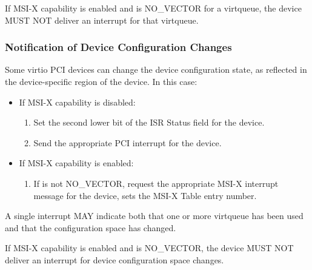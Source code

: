 If MSI-X capability is enabled and  is
NO_VECTOR for a virtqueue, the device MUST NOT deliver an interrupt
for that virtqueue.

\subsubsection{Notification of Device Configuration Changes}\label{sec:Virtio Transport Options / Virtio Over PCI Bus / PCI-specific Initialization And Device Operation / Notification of Device Configuration Changes}

Some virtio PCI devices can change the device configuration
state, as reflected in the device-specific region of the device. In this case:

\begin{itemize}
  \item If MSI-X capability is disabled:
    \begin{enumerate}
    \item Set the second lower bit of the ISR Status field for the device.

    \item Send the appropriate PCI interrupt for the device.
    \end{enumerate}

  \item If MSI-X capability is enabled:
    \begin{enumerate}
    \item If  is not NO_VECTOR,
      request the appropriate MSI-X interrupt message for the
      device,  sets the MSI-X Table entry
      number.
    \end{enumerate}
\end{itemize}

A single interrupt MAY indicate both that one or more virtqueue has
been used and that the configuration space has changed.


If MSI-X capability is enabled and  is
NO_VECTOR, the device MUST NOT deliver an interrupt
for device configuration space changes.

